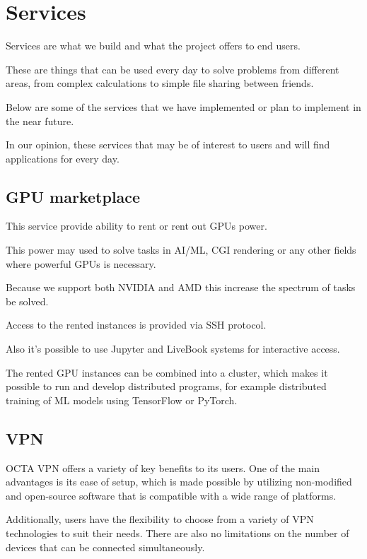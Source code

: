 \section{Services}

Services are what we build and what the project offers to end users.

These are things that can be used every day to solve problems from different areas, from complex calculations to simple file sharing between friends.

Below are some of the services that we have implemented or plan to implement in the near future.

In our opinion, these services that may be of interest to users and will find applications for every day.

\subsection{GPU marketplace}

This service provide ability to rent or rent out GPUs power.

This power may used to solve tasks in AI/ML, CGI rendering or any other fields where powerful GPUs is necessary.

Because we support both NVIDIA and AMD this increase the spectrum of tasks be solved.

Access to the rented instances is provided via SSH\cite{SSH} protocol.

Also it's possible to use Jupyter\cite{jupyter} and LiveBook\cite{livebook} systems for interactive access.

The rented GPU instances can be combined into a cluster, which makes it possible to run and develop distributed programs,
for example distributed training of ML models using TensorFlow\cite{tensorflow} or PyTorch\cite{pytorch}.

\subsection{VPN}

OCTA VPN\cite{VPN} offers a variety of key benefits to its users.
One of the main advantages is its ease of setup, which is made possible by utilizing non-modified and open-source software that is compatible with a wide range of platforms.

Additionally, users have the flexibility to choose from a variety of VPN technologies to suit their needs.
There are also no limitations on the number of devices that can be connected simultaneously.

